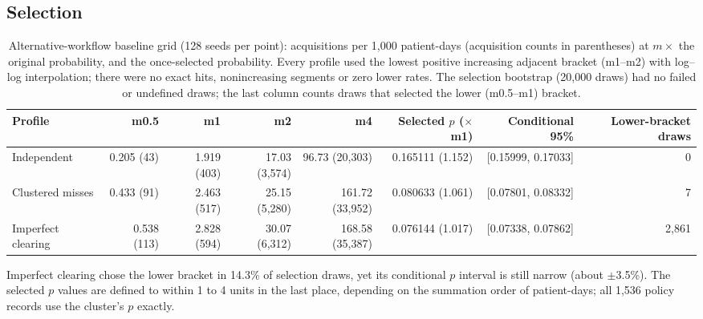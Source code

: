 \documentclass[11pt]{article}
\begin{document}
\subsection{Selection}\label{sec:s-alt-selection}
\begin{table}[htbp]\centering\footnotesize\setlength{\tabcolsep}{3.5pt}
\caption{Alternative-workflow baseline grid (128 seeds per point): acquisitions per 1,000 patient-days (acquisition counts in parentheses) at $m\times$ the original probability, and the once-selected probability. Every profile used the lowest positive increasing adjacent bracket (m1--m2) with log--log interpolation; there were no exact hits, nonincreasing segments or zero lower rates. The selection bootstrap (20,000 draws) had no failed or undefined draws; the last column counts draws that selected the lower (m0.5--m1) bracket.}\label{tab:alt-grid}
\begin{adjustbox}{max width=\linewidth}
\begin{tabular}{lrrrrrrr}\toprule
Profile & m0.5 & m1 & m2 & m4 & Selected $p$ ($\times$m1) & Conditional 95\% & Lower-bracket draws\\\midrule
Independent & 0.205 (43) & 1.919 (403) & 17.03 (3,574) & 96.73 (20,303) & 0.165111 (1.152) & [0.15999, 0.17033] & 0\\
Clustered misses & 0.433 (91) & 2.463 (517) & 25.15 (5,280) & 161.72 (33,952) & 0.080633 (1.061) & [0.07801, 0.08332] & 7\\
Imperfect clearing & 0.538 (113) & 2.828 (594) & 30.07 (6,312) & 168.58 (35,387) & 0.076144 (1.017) & [0.07338, 0.07862] & 2,861\\
\bottomrule\end{tabular}
\end{adjustbox}
\end{table}
Imperfect clearing chose the lower bracket in 14.3\% of selection draws, yet its
conditional $p$ interval is still narrow (about $\pm$3.5\%). The selected $p$
values are defined to within 1 to 4 units in the last place, depending on the
summation order of patient-days; all 1,536 policy records use the cluster's $p$
exactly.
\end{document}
